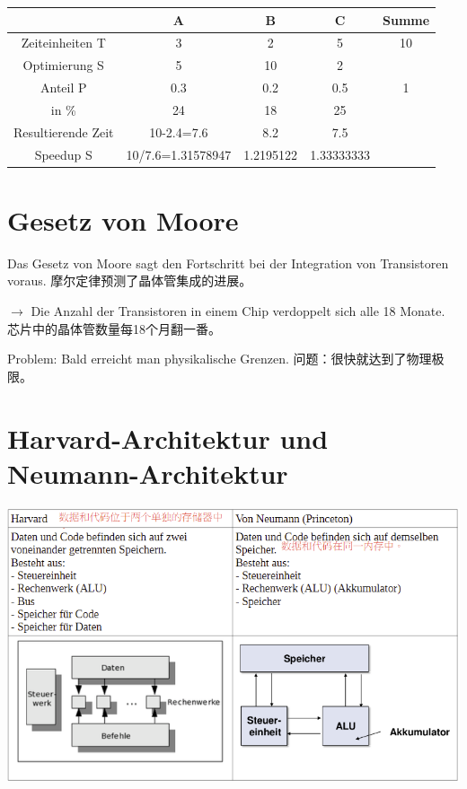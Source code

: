 \documentclass[fleqn]{article}
\begin{document}
\begin{center}
    \begin{tabular}{|c|c|c|c|c|}
        \hline
        &A&B&C&Summe\\
        \hline
        Zeiteinheiten T &3&2&5&10\\
        \hline
        Optimierung S&5&10&2&\\
        \hline
        Anteil P&0.3&0.2&0.5&1\\
        \hline
        \hline
        in \%&24&18&25&\\
        \hline
        Resultierende Zeit&10-2.4=7.6&8.2&7.5&\\
        \hline
        \hline
        Speedup S&10/7.6=1.31578947&1.2195122&1.33333333&\\
        \hline
    \end{tabular}
\end{center}
\section{Gesetz von Moore}

Das Gesetz von Moore sagt den Fortschritt bei der Integration von Transistoren voraus. 
摩尔定律预测了晶体管集成的进展。

$\rightarrow$ Die Anzahl der Transistoren in einem Chip verdoppelt sich alle 18 Monate. 芯片中的晶体管数量每18个月翻一番。

Problem: Bald erreicht man physikalische Grenzen. 问题：很快就达到了物理极限。

\section{Harvard-Architektur und Neumann-Architektur}

\begin{center}
    \includegraphics[scale=0.5]{1.png}
\end{center}
\end{document}
